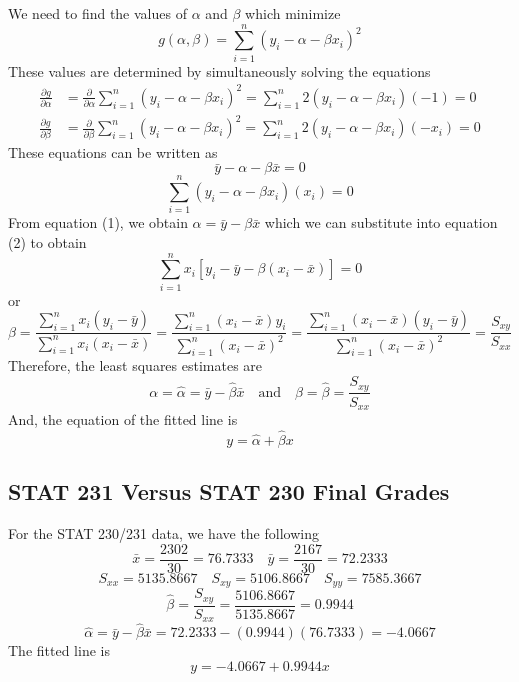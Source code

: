We need to find the values of $ \alpha $ and $ \beta $ which minimize
\[g(\alpha, \beta)=\sum_{i=1}^{n}\left(y_{i}-\alpha-\beta x_{i}\right)^{2}\]
These values are determined by simultaneously solving the equations
\[
    \begin{aligned}
        \frac{\partial g}{\partial \alpha} & =\frac{\partial}{\partial \alpha} \sum_{i=1}^{n}\left(y_{i}-\alpha-\beta x_{i}\right)^{2}=\sum_{i=1}^{n} 2\left(y_{i}-\alpha-\beta x_{i}\right)(-1)=0               \\
        \frac{\partial g}{\partial \beta}  & =\frac{\partial}{\partial \beta} \sum_{i=1}^{n}\left(y_{i}-\alpha-\beta x_{i}\right)^{2}=\sum_{i=1}^{n} 2\left(y_{i}-\alpha-\beta x_{i}\right)\left(-x_{i}\right)=0
    \end{aligned}
\]
These equations can be written as
\begin{equation}\tag{1}
    \bar{y}-\alpha-\beta \bar{x}=0
\end{equation}
\begin{equation}\tag{2}
    \sum_{i=1}^{n}\left(y_{i}-\alpha-\beta x_{i}\right)\left(x_{i}\right)=0
\end{equation}
From equation (1), we obtain $ \alpha=\bar{y}-\beta \bar{x} $ which
we can substitute into equation (2) to obtain
\[\sum_{i=1}^{n} x_{i}\left[y_{i}-\bar{y}-\beta\left(x_{i}-\bar{x}\right)\right]=0\]
or
\[\beta=
    \frac{\sum\limits_{i=1}^{n} x_{i}\left(y_{i}-\bar{y}\right)}
    {\sum\limits_{i=1}^{n} x_{i}\left(x_{i}-\bar{x}\right)}
    =\frac{\sum\limits_{i=1}^{n}\left(x_{i}-\bar{x}\right) y_{i}}
    {\sum\limits_{i=1}^{n}\left(x_{i}-\bar{x}\right)^{2}}
    =\frac{\sum\limits_{i=1}^{n}\left(x_{i}-\bar{x}\right)\left(y_{i}-\bar{y}\right)}
    {\sum\limits_{i=1}^{n}\left(x_{i}-\bar{x}\right)^{2}}
    =\frac{S_{x y}}{S_{x x}}\]
Therefore, the least squares estimates are
\[\alpha=\hat{\alpha}=\bar{y}-\hat{\beta} \bar{x}
    \quad \text{and} \quad \beta=\hat{\beta}=\frac{S_{x y}}{S_{x x}}\]
And, the equation of the fitted line is
\[y=\hat{\alpha}+\hat{\beta} x\]

\subsection{STAT 231 Versus STAT 230 Final Grades}

\begin{exbox}
    \begin{example}
        For the STAT 230/231 data, we have the following
        \[\bar{x}=\frac{2302}{30}=76.7333 \quad \bar{y}=\frac{2167}{30}=72.2333\]
        \[S_{x x}=5135.8667 \quad S_{x y}=5106.8667 \quad S_{y y}=7585.3667\]
        \[\hat{\beta}=\frac{S_{x y}}{S_{x x}}=\frac{5106.8667}{5135.8667}=0.9944\]
        \[\hat{\alpha}=\bar{y}-\hat{\beta} \bar{x}=72.2333-(0.9944)(76.7333)=-4.0667\]
        The fitted line is
        \[y=-4.0667+0.9944 x\]
    \end{example}
\end{exbox}


